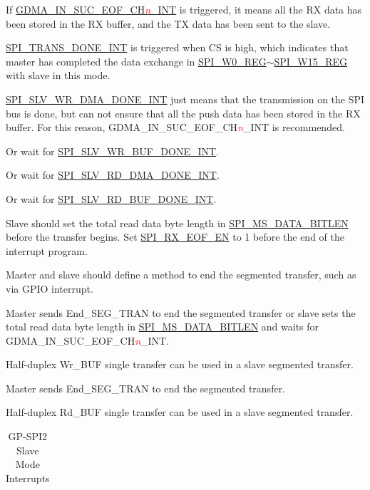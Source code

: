 \documentclass[main\_\_EN.tex]{subfiles}
\begin{document}
\begin{ThreePartTable}

\begin{TableNotes}
    \item[1] If \hyperref[int:GDMAINSUCEOFINT]{GDMA\_IN\_SUC\_EOF\_CH\textcolor{red}{\it{n}}\_INT} is triggered, it means all the RX data has been stored in the RX buffer, and the TX data has been sent to the slave.
    \item[2] \hyperref[int:SPITRANSDONEINT]{SPI\_TRANS\_DONE\_INT} is triggered when CS is high, which indicates that master has completed the data exchange in \hyperref[regdesc:SPIW0REG]{SPI\_W0\_REG}$\sim$\hyperref[regdesc:SPIW15REG]{SPI\_W15\_REG} with slave in this mode.
    \item[3] \hyperref[int:SPISLVWRDMADONEINT]{SPI\_SLV\_WR\_DMA\_DONE\_INT} just means that the transmission on the SPI bus is done, but can not ensure that all the push data has been stored in the RX buffer. For this reason, GDMA\_IN\_SUC\_EOF\_CH\textcolor{red}{\it{n}}\_INT is recommended.
    \item[4] Or wait for \hyperref[int:SPISLVWRBUFDONEINT]{SPI\_SLV\_WR\_BUF\_DONE\_INT}.
    \item[5] Or wait for \hyperref[int:SPISLVRDDMADONEINT]{SPI\_SLV\_RD\_DMA\_DONE\_INT}.
    \item[6] Or wait for \hyperref[int:SPISLVRDBUFDONEINT]{SPI\_SLV\_RD\_BUF\_DONE\_INT}.
    \item[7] Slave should set the total read data byte length in \hyperref[fielddesc:SPIMSDATABITLEN]{SPI\_MS\_DATA\_BITLEN} before the transfer begins. Set \hyperref[fielddesc:SPIRXEOFEN]{SPI\_RX\_EOF\_EN} to 1 before the end of the interrupt program.
    \item[8] Master and slave should define a method to end the segmented transfer, such as via GPIO interrupt.
    \item[9] Master sends End\_SEG\_TRAN to end the segmented transfer or slave sets the total read data byte length in \hyperref[fielddesc:SPIMSDATABITLEN]{SPI\_MS\_DATA\_BITLEN} and waits for GDMA\_IN\_SUC\_EOF\_CH\textcolor{red}{\it{n}}\_INT.
    \item[10] Half-duplex Wr\_BUF single transfer can be used in a slave segmented transfer.
    \item[11] Master sends End\_SEG\_TRAN to end the segmented transfer.
    \item[12] Half-duplex Rd\_BUF single transfer can be used in a slave segmented transfer.
\end{TableNotes}
\begin{longtable}[c]{|l|l|l|l|}
\caption{GP-SPI2 Slave Mode Interrupts}
\label{Table:Slv_Int_Table}
\\\hline


\end{longtable}
\end{ThreePartTable}
\end{document}
